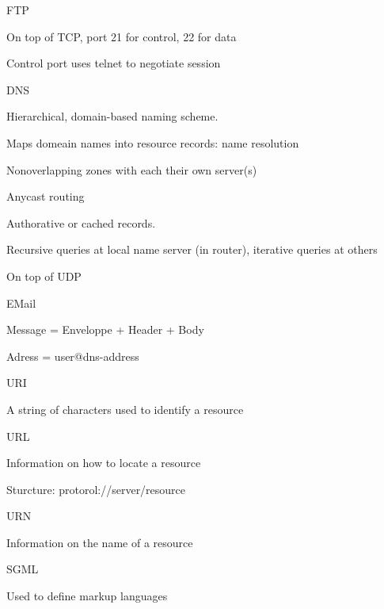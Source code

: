 \documentclass[main.tex]{subfiles}
\begin{document}
\begin{card}{FTP}
\item On top of TCP, port 21 for control, 22 for data
\item Control port uses telnet to negotiate session
\end{card}

\begin{card}{DNS}
\item Hierarchical, domain-based naming scheme.
\item Maps domeain names into resource records: name resolution
\item Nonoverlapping zones with each their own server(s)
\item Anycast routing
\item Authorative or cached records.
\item Recursive queries at local name server (in router), iterative queries at others
\item On top of UDP
\end{card}

\begin{card}{EMail}
\item Message = Enveloppe + Header + Body
\item Adress = user@dns-address
\end{card}

\begin{card}{URI}
\item A string of characters used to identify a resource
\end{card}

\begin{card}{URL}
\item Information on how to locate a resource
\item Sturcture: protorol://server/resource
\end{card}

\begin{card}{URN}
\item Information on the name of a resource
\end{card}

\begin{card}{SGML}
\item Used to define markup languages
\end{card}
\end{document}
